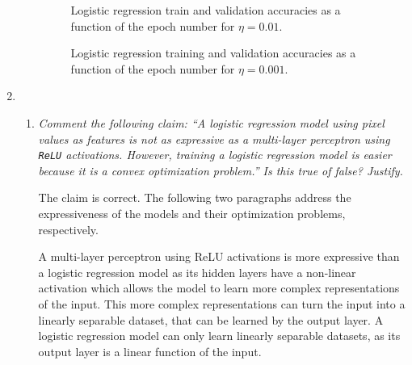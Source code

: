 \documentclass[12pt]{article}
\begin{document}
\begin{enumerate}[leftmargin=\labelsep]
\begin{enumerate}[label=\alph*)]
                    \begin{figure}[H]
                        \centering
                        
                        \caption{Logistic regression train and validation accuracies as a function of the epoch number for $\eta = 0.01$.}
                        \label{fig:logistic_regression-50-0.01}
                    \end{figure}

                    \begin{figure}[H]
                        \centering
                        
                        \caption{Logistic regression training and validation accuracies as a function of the epoch number for $\eta = 0.001$.}
                        \label{fig:logistic_regression-50-0.001}
                    \end{figure}

          \end{enumerate}

    \item

          \begin{enumerate}[label=\alph*)]

              \item \textit{Comment the following claim: “A logistic regression model using pixel values
                        as features is not as expressive as a multi-layer perceptron using \texttt{ReLU} activations.
                        However, training a logistic regression model is easier because it is a convex optimization
                        problem.” Is this true of false? Justify.}

                    \vspace{12pt}

                    The claim is correct. The following two paragraphs address the expressiveness of the models and their optimization problems, respectively.

                    \vspace{12pt}

                    A multi-layer perceptron using ReLU activations is more expressive than a logistic regression model as its hidden layers have a non-linear activation which allows the model to learn more complex representations of the input. This more complex representations can turn the input into a linearly separable dataset, that can be learned by the output layer. A logistic regression model can only learn linearly separable datasets, as its output layer is a linear function of the input.


\end{enumerate}
\end{enumerate}
\end{document}
